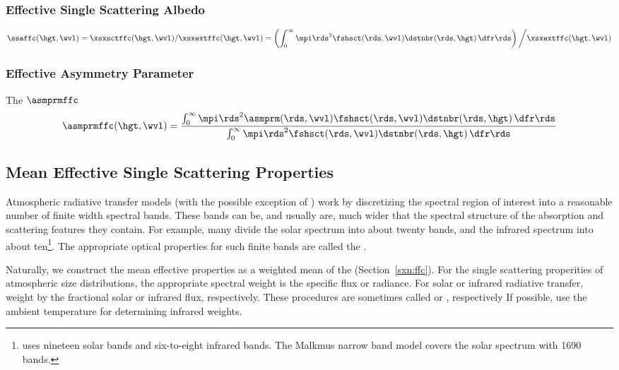 \documentclass[12pt]{article}
\begin{document}
\subsubsection[Effective Single Scattering Albedo]{Effective Single Scattering Albedo}\label{sxn:ssa_ffc}
\begin{equation}
\ssaffc(\hgt,\wvl) = \xsxsctffc(\hgt,\wvl)/\xsxextffc(\hgt,\wvl) =
\left( \int_{0}^{\infty}
\mpi \rds^{2} \fshsct(\rds,\wvl) \dstnbr(\rds,\hgt) \,\dfr\rds \right)
\bigg/ \xsxextffc(\hgt,\wvl)
\label{eqn:ssa_ffc}
\end{equation}

\subsubsection[Effective Asymmetry Parameter]{Effective Asymmetry Parameter}\label{sxn:asm_prm_ffc}
The  $\asmprmffc$ 
\begin{equation}
\asmprmffc(\hgt,\wvl) = \frac{\int_{0}^{\infty}
\mpi \rds^{2} \asmprm(\rds,\wvl) \fshsct(\rds,\wvl) \dstnbr(\rds,\hgt) \,
\dfr\rds }{
\int_{0}^{\infty} \mpi \rds^{2} \fshsct(\rds,\wvl) \dstnbr(\rds,\hgt) \,
\dfr\rds } 
\label{eqn:asm_prm_ffc}
\end{equation}

\subsection{Mean Effective Single Scattering Properties}\label{sxn:ffc_avg}
Atmospheric radiative transfer models (with the possible exception of
) work by discretizing the spectral region
of interest into a reasonable number of finite width spectral bands.
These bands can be, and usually are, much wider that the spectral
structure of the absorption and scattering features they contain.
For example, many  divide the solar spectrum into about
twenty bands, and the infrared spectrum into about
ten\footnote{ uses nineteen solar bands and six-to-eight
  infrared bands.
The Malkmus narrow band model  covers the solar spectrum
with 1690 bands.}. 
The appropriate optical properties for such finite bands are called the
.

Naturally, we construct the mean effective properties as a weighted
mean of the 
(Section~\ref{sxn:ffc}).   
For the single scattering properities of atmospheric size
distributions, the appropriate spectral weight is the specific flux or
radiance. 
For solar or infrared radiative transfer, weight by the fractional
solar or infrared flux, respectively.
These procedures are sometimes called  or
, respectively
If possible, use the ambient temperature for determining infrared
weights. 
\end{document}
